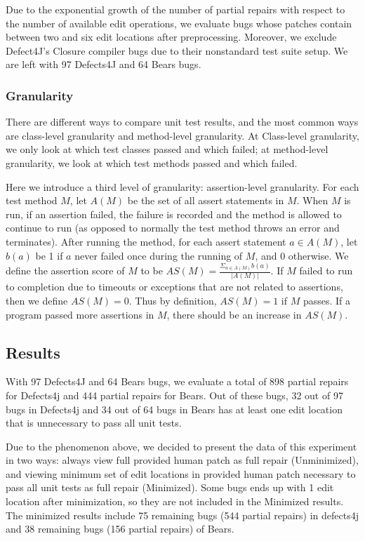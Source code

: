 \documentclass[sigconf, timestamp-false, anonymous=true]{acmart}
\begin{document}
Due to the exponential growth of the number of partial repairs with respect 
to the number of available edit operations, we evaluate bugs whose patches 
contain between two and six edit locations after preprocessing.
Moreover, we exclude Defect4J's Closure compiler bugs due to 
their nonstandard test suite setup.
We are left with 97 Defects4J and 64 Bears bugs.

\subsubsection{Granularity}

There are different ways to compare unit test results, and the most common ways 
are class-level granularity and method-level granularity. At Class-level granularity, 
we only look at which test classes passed and which failed; at method-level 
granularity, we look at which test methods passed and which failed.

Here we introduce a third level of granularity: assertion-level granularity. 
For each test method $M$, let $A(M)$ be the set of all assert statements in $M$. 
When $M$ is run, if an assertion failed, the failure is recorded and the method 
is allowed to continue to run (as opposed to normally the test method throws an 
error and terminates). After running the method, for each assert statement 
$a\in A(M)$, let $b(a)$ be 1 if $a$ never failed once during the running of $M$, 
and 0 otherwise. We define the assertion score of $M$ to be 
$AS(M)=\frac{\Sigma_{a\in A(M)}b(a)}{|A(M)|}$. If $M$ failed to run to completion 
due to timeouts or exceptions that are not related to assertions, then we define 
$AS(M)=0$. Thus by definition, $AS(M)=1$ if $M$ passes. If a program passed more 
assertions in $M$, there should be an increase in $AS(M)$.


\subsection{Results}

With 97 Defects4J and 64 Bears bugs, we evaluate
a total of 898 partial repairs for Defects4j and 444 partial repairs for Bears.
Out of these bugs, 32 out of 97 bugs in Defects4j and 
34 out of 64 bugs in Bears has at least one edit location that
is unnecessary to pass all unit tests.

Due to the phenomenon above, we decided to present the
data of this experiment in two ways: always view full provided human patch as full repair
(Unminimized), and viewing minimum set of edit locations in provided human patch necessary
to pass all unit tests as full repair (Minimized).
Some bugs ends up with 1 edit location after minimization, 
so they are not included in the Minimized results. The minimized results 
include 75 remaining bugs (544 partial repairs) in defects4j and 38 remaining bugs (156 partial repairs) of Bears. 
\end{document}
